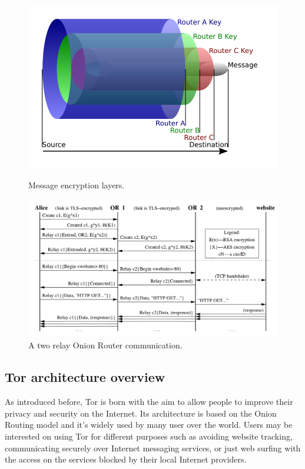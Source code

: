 \begin{figure}[H]
	\centering
	\includegraphics[scale=0.30]{onion.png}
	\caption{Message encryption layers.}
	\label{fig:onion}
	\includegraphics[scale=0.30]{or-communication.png}
	\caption{A two relay Onion Router communication.\cite{dingledine2004tor}}
\end{figure}	

\subsection{Tor architecture overview}
As introduced before, Tor is born with the aim to allow people to
improve their privacy and security on the Internet. Its architecture is
based on the Onion Routing model and it's widely used by many user over
the world. Users may be interested on using Tor for different purposes
such as avoiding website tracking, communicating securely over Internet
messaging services, or just web surfing with the access on the services
blocked by their local Internet providers.

